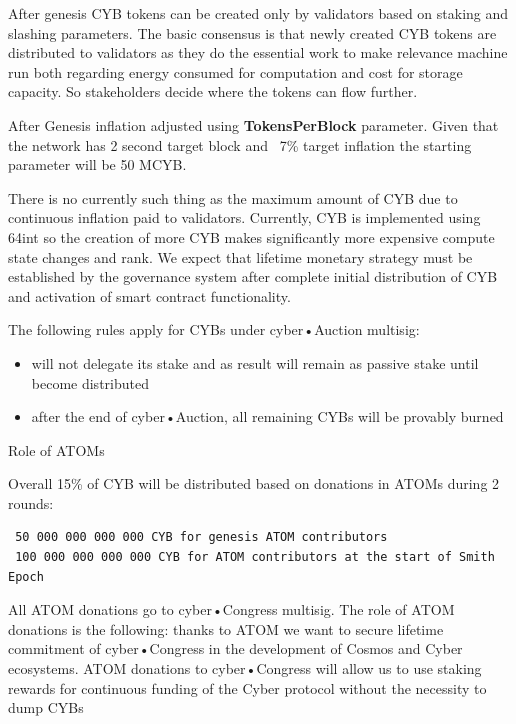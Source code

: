 \documentclass[10pt,oneside]{amsart}
\makeatletter
\def\section{\@startsection{section}{1}%
  \z@{.7\linespacing\@plus\linespacing}{.5\linespacing}%
  {\normalfont\scshape}}%
\newcommand{\code}[1]{\textbf{#1}}
\makeatother
\begin{document}
After genesis CYB tokens can be created only by validators based on staking and slashing parameters. The basic consensus is that newly created CYB tokens are distributed to validators as they do the essential work to make relevance machine run both regarding energy consumed for computation and cost for storage capacity. So stakeholders decide where the tokens can flow further.

After Genesis inflation adjusted using \code{TokensPerBlock} parameter. Given that the network has 2 second target block and ~7\% target inflation the starting parameter will be 50 MCYB.

There is no currently such thing as the maximum amount of CYB due to continuous inflation paid to validators. Currently, CYB is implemented using 64int so the creation of more CYB makes significantly more expensive compute state changes and rank. We expect that lifetime monetary strategy must be established by the governance system after complete initial distribution of CYB and activation of smart contract functionality.

The following rules apply for CYBs under cyber•Auction multisig:

\begin{itemize}
\item will not delegate its stake and as result will remain as passive stake until become distributed
\item after the end of cyber•Auction, all remaining CYBs will be provably burned
\end{itemize}

\section{Role of ATOMs}\label{Role of ATOMs}

Overall 15\% of CYB will be distributed based on donations in ATOMs during 2 rounds:

\begin{lstlisting}
 50 000 000 000 000 CYB for genesis ATOM contributors
 100 000 000 000 000 CYB for ATOM contributors at the start of Smith Epoch
\end{lstlisting}

All ATOM donations go to cyber•Congress multisig. The role of ATOM donations is the following: thanks to ATOM we want to secure lifetime commitment of cyber•Congress in the development of Cosmos and Cyber ecosystems. ATOM donations to cyber•Congress will allow us to use staking rewards for continuous funding of the Cyber protocol without the necessity to dump CYBs
\end{document}
